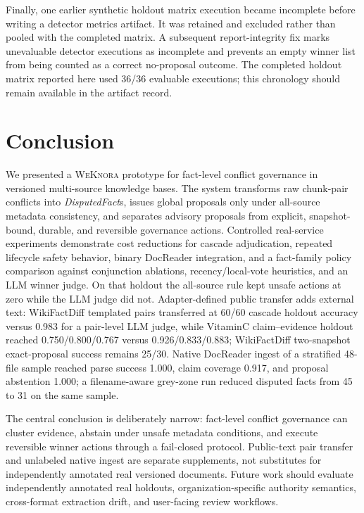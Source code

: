 \documentclass[conference]{IEEEtran}
\newcommand{\sys}{\textsc{WeKnora}}
\newcommand{\disputedfact}{\textit{DisputedFact}}
\begin{document}
Finally, one earlier synthetic holdout matrix execution became incomplete before writing a detector metrics artifact. It was retained and excluded rather than pooled with the completed matrix. A subsequent report-integrity fix marks unevaluable detector executions as incomplete and prevents an empty winner list from being counted as a correct no-proposal outcome. The completed holdout matrix reported here used 36/36 evaluable executions; this chronology should remain available in the artifact record.

\section{Conclusion}
\label{sec:conclusion}

We presented a \sys{} prototype for fact-level conflict governance in versioned multi-source knowledge bases. The system transforms raw chunk-pair conflicts into \disputedfact{}s, issues global proposals only under all-source metadata consistency, and separates advisory proposals from explicit, snapshot-bound, durable, and reversible governance actions. Controlled real-service experiments demonstrate cost reductions for cascade adjudication, repeated lifecycle safety behavior, binary DocReader integration, and a fact-family policy comparison against conjunction ablations, recency/local-vote heuristics, and an LLM winner judge. On that holdout the all-source rule kept unsafe actions at zero while the LLM judge did not. Adapter-defined public transfer adds external text: WikiFactDiff templated pairs transferred at 60/60 cascade holdout accuracy versus 0.983 for a pair-level LLM judge, while VitaminC claim--evidence holdout reached 0.750/0.800/0.767 versus 0.926/0.833/0.883; WikiFactDiff two-snapshot exact-proposal success remains 25/30. Native DocReader ingest of a stratified 48-file sample reached parse success 1.000, claim coverage 0.917, and proposal abstention 1.000; a filename-aware grey-zone run reduced disputed facts from 45 to 31 on the same sample.

The central conclusion is deliberately narrow: fact-level conflict governance can cluster evidence, abstain under unsafe metadata conditions, and execute reversible winner actions through a fail-closed protocol. Public-text pair transfer and unlabeled native ingest are separate supplements, not substitutes for independently annotated real versioned documents. Future work should evaluate independently annotated real holdouts, organization-specific authority semantics, cross-format extraction drift, and user-facing review workflows.

\balance


\end{document}

